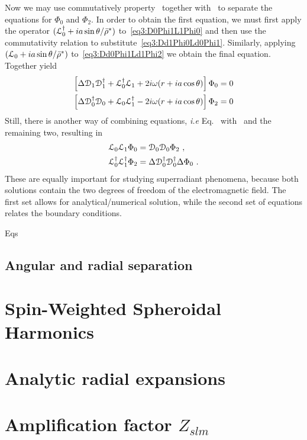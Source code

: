 Now we may use commutatively property~ together with~ to separate the equations for $\Phi_0$ and $\Phi_2$.
In order to obtain the first equation, we must first apply the operator $(\EuScript{L}^\dagger_0 + i a \sin\theta/\bar{\rho}^*)$ to~\eqref{eq3:D0Phi1L1Phi0} and then use the commutativity relation to substitute~\eqref{eq3:Dd1Phi0Ld0Phi1}.
Similarly, applying $(\EuScript{L}_0 + i a \sin\theta/\bar{\rho}^*)$ to~\eqref{eq3:Dd0Phi1Ld1Phi2} we obtain the final equation.
Together yield
\begin{align}
    \label{eq3:DDLLPhi0}
    \left[ \Delta \EuScript{D}_1 \EuScript{D}^\dagger_1 + \EuScript{L}^\dagger_0 \EuScript{L}_1 + 2 i \omega (r+i a \cos\theta) \right] \Phi_0 = 0 \\
    \label{eq3:DDLLPhi2}
    \left[ \Delta \EuScript{D}^\dagger_0 \EuScript{D}_0 + \EuScript{L}_0 \EuScript{L}^\dagger_1 - 2 i \omega (r+i a \cos\theta) \right] \Phi_2 = 0 
\end{align}
Still, there is another way of combining equations, \emph{i.e} Eq.~ with~ and the remaining two, resulting in
\begin{align}
    \label{eq3:LLPhi0DDPhi2}
    \EuScript{L}_0 \EuScript{L}_1 \Phi_0 &= \EuScript{D}_0 \EuScript{D}_0 \Phi_2 ~,\\
    \label{eq3:LLPhi2DDPhi0}
    \EuScript{L}^\dagger_0 \EuScript{L}^\dagger_1 \Phi_2 &= \Delta \EuScript{D}^\dagger_0 \EuScript{D}^\dagger_0 \Delta \Phi_0 ~.
\end{align}
These are equally important for studying superradiant phenomena, because both solutions contain the two degrees of freedom of the electromagnetic field. The first set allows for analytical/numerical solution, while the second set of equations relates the boundary conditions.

Eqs


\subsection{Angular and radial separation}



\section{Spin-Weighted Spheroidal Harmonics}

\section{Analytic radial expansions}

\section{Amplification factor $Z_{slm}$}


\cleardoublepage